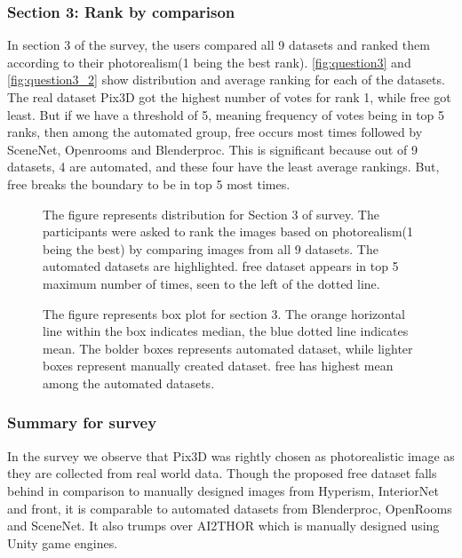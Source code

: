 \subsubsection{Section 3: Rank by comparison}
In section 3 of the survey, the users compared all 9 datasets and ranked them according to their photorealism(1 being the best rank).
\autoref{fig:question3} and \autoref{fig:question3_2} show distribution and average ranking for each of the datasets.
The real dataset Pix3D got the highest number of votes for rank 1, while \gls{free} got least.
But if we have a threshold of 5, meaning frequency of votes being in top 5 ranks, then among the automated group, \gls{free} occurs most times followed by SceneNet, Openrooms and Blenderproc.
This is significant because out of 9 datasets, 4 are automated, and these four have the least average rankings.
But, \gls{free} breaks the boundary to be in top 5 most times.

\begin{figure}
    \centering
    \resizebox{\textwidth}{!}{}
    \caption{The figure represents distribution for Section 3 of survey. The participants were asked to rank the images based on photorealism(1 being the best) by comparing images from all 9 datasets.
    The automated datasets are highlighted. \gls{free} dataset appears in top 5 maximum number of times, seen to the left of the dotted line.}
    \label{fig:question3}
\end{figure}

\begin{figure}
    \centering
    \resizebox{0.75\textwidth}{!}{}
    \caption{The figure represents box plot for section 3. The orange horizontal line within the box indicates median, the blue dotted line indicates mean.
    The bolder boxes represents automated dataset, while lighter boxes represent manually created dataset. \Gls{free} has highest mean among the automated datasets.}
    \label{fig:question3_2}
\end{figure}

\subsubsection{Summary for survey}
In the survey we observe that Pix3D was rightly chosen as photorealistic image as they are collected from real world data.
Though the proposed \gls{free} dataset falls behind in comparison to manually designed images from Hyperism, InteriorNet and \gls{front},
it is comparable to automated datasets from Blenderproc, OpenRooms and SceneNet.
It also trumps over AI2THOR which is manually designed using Unity game engines.

